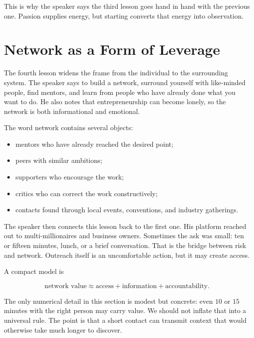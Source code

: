 This is why the speaker says the third lesson goes hand in hand with the previous one. Passion supplies energy, but starting converts that energy into observation.

\section{Network as a Form of Leverage}

The fourth lesson widens the frame from the individual to the surrounding system. The speaker says to build a network, surround yourself with like-minded people, find mentors, and learn from people who have already done what you want to do. He also notes that entrepreneurship can become lonely, so the network is both informational and emotional.

The word network contains several objects:

\begin{itemize}
\item mentors who have already reached the desired point;
\item peers with similar ambitions;
\item supporters who encourage the work;
\item critics who can correct the work constructively;
\item contacts found through local events, conventions, and industry gatherings.
\end{itemize}

The speaker then connects this lesson back to the first one. His platform reached out to multi-millionaires and business owners. Sometimes the ask was small: ten or fifteen minutes, lunch, or a brief conversation. That is the bridge between risk and network. Outreach itself is an uncomfortable action, but it may create access.

A compact model is

\begin{equation}
\text{network value}
\approx
\text{access}
+
\text{information}
+
\text{accountability}.
\end{equation}

The only numerical detail in this section is modest but concrete: even \(10\) or \(15\) minutes with the right person may carry value. We should not inflate that into a universal rule. The point is that a short contact can transmit context that would otherwise take much longer to discover.


